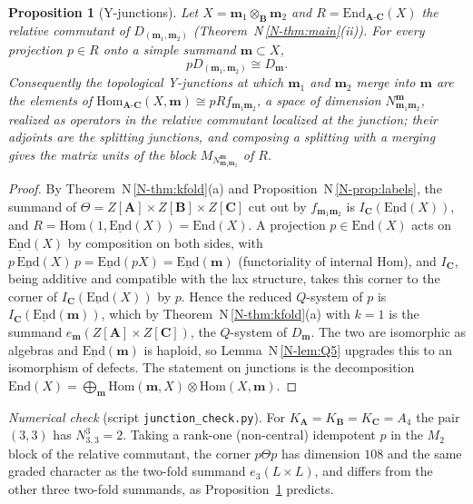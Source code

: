\documentclass[11pt]{article}
\newtheorem{proposition}[theorem]{Proposition}
\theoremstyle{definition}
\theoremstyle{remark}
\newcommand{\bfB}{\mathbf B}
\newcommand{\bfA}{\mathbf A}
\newcommand{\bfC}{\mathbf C}
\newcommand{\nref}[1]{N\,\ref{N-#1}}
\begin{document}
\begin{proposition}[Y-junctions]\label{prop:Y}
Let $X=\mathbf m_1\otimes_{\bfB}\mathbf m_2$ and $R=\mathrm{End}_{\bfA\text{-}\bfC}(X)$ the relative commutant of $D_{(\mathbf m_1,\mathbf m_2)}$ (Theorem~\nref{thm:main}(ii)). For every projection $p\in R$ onto a simple summand $\mathbf m\subset X$,
\[
pD_{(\mathbf m_1,\mathbf m_2)}\cong D_{\mathbf m}.
\]
Consequently the topological Y-junctions at which $\mathbf m_1$ and $\mathbf m_2$ merge into $\mathbf m$ are the elements of $\mathrm{Hom}_{\bfA\text{-}\bfC}(X,\mathbf m)\cong pRf_{\mathbf m_1\mathbf m_2}$, a space of dimension $N^{\mathbf m}_{\mathbf m_1\mathbf m_2}$, realized as operators in the relative commutant localized at the junction; their adjoints are the splitting junctions, and composing a splitting with a merging gives the matrix units of the block $M_{N^{\mathbf m}_{\mathbf m_1\mathbf m_2}}$ of $R$.
\end{proposition}
\begin{proof}
By Theorem~\nref{thm:kfold}(a) and Proposition~\nref{prop:labels}, the summand of $\Theta=Z[\bfA]\times Z[\bfB]\times Z[\bfC]$ cut out by $f_{\mathbf m_1\mathbf m_2}$ is $I_{\bfC}(\underline{\mathrm{End}}(X))$, and $R=\mathrm{Hom}(1,\underline{\mathrm{End}}(X))=\mathrm{End}(X)$. A projection $p\in\mathrm{End}(X)$ acts on $\underline{\mathrm{End}}(X)$ by composition on both sides, with $p\,\underline{\mathrm{End}}(X)\,p=\underline{\mathrm{End}}(pX)=\underline{\mathrm{End}}(\mathbf m)$ (functoriality of internal Hom), and $I_{\bfC}$, being additive and compatible with the lax structure, takes this corner to the corner of $I_{\bfC}(\underline{\mathrm{End}}(X))$ by $p$. Hence the reduced $Q$-system of $p$ is $I_{\bfC}(\underline{\mathrm{End}}(\mathbf m))$, which by Theorem~\nref{thm:kfold}(a) with $k=1$ is the summand $e_{\mathbf m}(Z[\bfA]\times Z[\bfC])$, the $Q$-system of $D_{\mathbf m}$. The two are isomorphic as algebras and $\underline{\mathrm{End}}(\mathbf m)$ is haploid, so Lemma~\nref{lem:Q5} upgrades this to an isomorphism of defects. The statement on junctions is the decomposition $\mathrm{End}(X)=\bigoplus_{\mathbf m}\mathrm{Hom}(\mathbf m,X)\otimes\mathrm{Hom}(X,\mathbf m)$.
\end{proof}
\emph{Numerical check} (script \texttt{junction\_check.py}). For $K_{\bfA}=K_{\bfB}=K_{\bfC}=A_4$ the pair $(3,3)$ has $N^{3}_{3,3}=2$. Taking a rank-one (non-central) idempotent $p$ in the $M_2$ block of the relative commutant, the corner $p\Theta p$ has dimension $108$ and the same graded character as the two-fold summand $e_3(L\times L)$, and differs from the other three two-fold summands, as Proposition~\ref{prop:Y} predicts.
\end{document}
